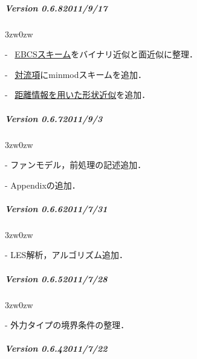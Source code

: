 
{\small

%
\subparagraph{Version 0.6.8\hspace{1cm}2011/9/17}

\begin{description}
\begin{indentation}{3zw}{0zw}
\item[-] {}~\hyperlink{tgt:ebcs}{EBCSスキーム}をバイナリ近似と面近似に整理．
\item[-] {}~\hyperlink{tgt:convection term}{対流項}にminmodスキームを追加．
\item[-] {}~\hyperlink{tgt:dist_info_scheme}{距離情報を用いた形状近似}を追加．
\end{indentation}
\end{description}
\vspace{3mm}

%
\subparagraph{Version 0.6.7\hspace{1cm}2011/9/3}

\begin{description}
\begin{indentation}{3zw}{0zw}
\item[-] ファンモデル，前処理の記述追加．
\item[-] Appendixの追加．
\end{indentation}
\end{description}
\vspace{3mm}

%
\subparagraph{Version 0.6.6\hspace{1cm}2011/7/31}

\begin{description}
\begin{indentation}{3zw}{0zw}
\item[-] LES解析，アルゴリズム追加．
\end{indentation}
\end{description}
\vspace{3mm}

%
\subparagraph{Version 0.6.5\hspace{1cm}2011/7/28}

\begin{description}
\begin{indentation}{3zw}{0zw}
\item[-] 外力タイプの境界条件の整理．
\end{indentation}
\end{description}
\vspace{3mm}

%
\subparagraph{Version 0.6.4\hspace{1cm}2011/7/22}

}
